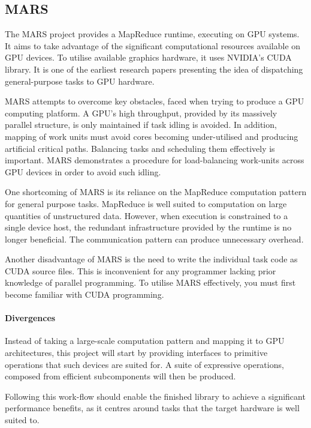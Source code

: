 \subsection{MARS}
The MARS\cite{mars} project provides a MapReduce\cite{mapreduce} runtime, executing on \ac{GPU} systems.
It aims to take advantage of the significant computational resources available on \ac{GPU} devices. To utilise available graphics hardware, it uses NVIDIA's \ac{CUDA} library. It is one of the earliest research papers presenting the idea of dispatching general-purpose tasks to \ac{GPU} hardware.

MARS attempts to overcome key obstacles, faced when trying to produce a \ac{GPU} computing platform.
A \ac{GPU}'s high throughput, provided by its massively parallel structure, is only maintained if task idling is avoided. In addition, mapping of work units must avoid cores becoming under-utilised and producing artificial critical paths. Balancing tasks and scheduling them effectively is important. MARS demonstrates a procedure for load-balancing work-units across \ac{GPU} devices in order to avoid such idling.

One shortcoming of MARS is its reliance on the MapReduce computation pattern for general purpose tasks. MapReduce is well suited to computation on large quantities of unstructured data. However, when execution is constrained to a single device host, the redundant infrastructure provided by the runtime is no longer beneficial. The communication pattern can produce unnecessary overhead.

Another disadvantage of MARS is the need to write the individual task code as \ac{CUDA} source files. This is inconvenient for any programmer lacking prior knowledge of parallel programming. To utilise MARS effectively, you must first become familiar with \ac{CUDA} programming.

\paragraph*{Divergences}
Instead of taking a large-scale computation pattern and mapping it to \ac{GPU} architectures, this project will start by providing interfaces to primitive operations that such devices are suited for. A suite of expressive operations, composed from efficient subcomponents will then be produced.

Following this work-flow should enable the finished library to achieve a significant performance benefits, as it centres around tasks that the target hardware is well suited to.

